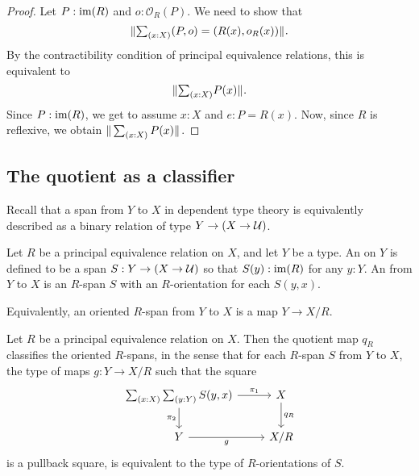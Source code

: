 \begin{proof}
Let $P:\operatorname{im}(R)$ and $o:\mathcal{O}_R(P)$. We need to show that
\begin{equation*}
\brck{\sm{x:X}\pairr{P,o}=\pairr{R(x),o_R(x)}}.
\end{equation*}
By the contractibility condition of principal equivalence relations, this is equivalent to
\begin{equation*}
\brck{\sm{x:X}P(x)}.
\end{equation*}
Since $P:\operatorname{im}(R)$, we get to assume $x:X$ and $e:P=R(x)$. Now, since $R$ is reflexive, we obtain $\brck{\sm{x:X}P(x)}$. 
\end{proof}

\subsection{The quotient as a classifier}

Recall that a span from $Y$ to $X$ in dependent type theory is equivalently described as a binary relation of type $Y\to (X\to \mathcal{U})$. 

\begin{defn}
Let $R$ be a principal equivalence relation on $X$, and let $Y$ be a type. An  on $Y$ is defined to be a span $S:Y\to (X\to\mathcal{U})$ so that $S(y):\operatorname{im}(R)$ for any $y:Y$. An  from $Y$ to $X$ is an $R$-span $S$ with an $R$-orientation for each $S(y,x)$.
\end{defn}

\begin{rmk}
Equivalently, an oriented $R$-span from $Y$ to $X$ is a map $Y\to X/R$. 
\end{rmk}

\begin{thm}\label{thm:classifying}
Let $R$ be a principal equivalence relation on $X$. Then the quotient map $q_R$
classifies the oriented $R$-spans, in the sense that for each $R$-span $S$ from $Y$ to $X$, the type of maps $g:Y\to X/R$ such that the square
\begin{equation}\label{eq:classifier}
\begin{tikzcd}
\sm{x:X}{y:Y}S(y,x) \arrow[r,"\pi_1"] \arrow[d,swap,"\pi_2"] & X \arrow[d,"q_R"] \\
Y \arrow[r,swap,"g"] & X/R
\end{tikzcd}
\end{equation}
is a pullback square, is equivalent to the type of $R$-orientations of $S$.  
\end{thm}

